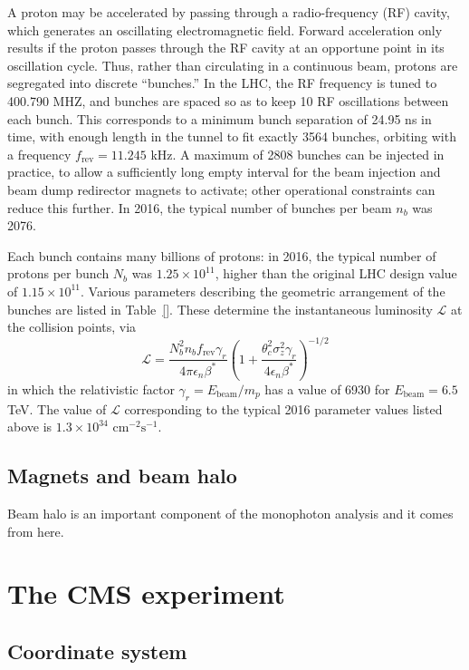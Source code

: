 \documentclass[oneside, letterpaper, 12pt, oldfontcommands]{memoir}
\begin{document}
A proton may be accelerated by passing through a radio-frequency (RF) cavity, which generates an oscillating electromagnetic
field. Forward acceleration only results if the proton passes through the RF cavity at an opportune point in its oscillation cycle.
Thus, rather than circulating in a continuous beam, protons are segregated into discrete ``bunches.'' In the LHC, the RF
frequency is tuned to 400.790 MHZ, and bunches are spaced so as to keep 10 RF oscillations between each bunch. This corresponds
to a minimum bunch separation of 24.95 ns in time, with enough length in the tunnel to fit exactly 3564 bunches, orbiting
with a frequency $f_\mathrm{rev} = 11.245$ kHz. A maximum of
2808 bunches can be injected in practice, to allow a sufficiently long empty interval for the beam injection and beam dump
redirector magnets to activate; other operational constraints can reduce this further.
In 2016, the typical number of bunches per beam $n_b$ was 2076.

Each bunch contains many billions of protons: in 2016, the typical number of protons per bunch $N_b$ was $1.25 \times 10^{11}$, higher than
the original LHC design value of $1.15 \times 10^{11}$. Various parameters describing the geometric arrangement of the bunches
are listed in Table~\ref{}. These determine the instantaneous luminosity $\mathcal{L}$ at the collision points, via
\begin{equation}
\mathcal{L} = \frac{N_{b}^{2}n_{b}f_\mathrm{rev}\gamma_{r}}{4\pi\epsilon_{n}\beta^\mathrm{*}}\left(1 + \frac{\theta_{c}^{2}\sigma_{z}^{2}\gamma_{r}}{4\epsilon_{n}\beta^\mathrm{*}}\right)^{-1/2}
\end{equation}
in which the relativistic factor $\gamma_{r} = E_\mathrm{beam}/m_{p}$ has a value of 6930 for $E_\mathrm{beam} = 6.5$ TeV.
The value of $\mathcal{L}$ corresponding to the typical 2016 parameter values listed above is $1.3 \times 10^{34}$ $\mathrm{cm}^{-2}\mathrm{s}^{-1}$.

\subsection{Magnets and beam halo} \label{sec:LHCCMS_LHC_magnets_beam_halo}
Beam halo is an important component of the monophoton analysis and it comes from here.
\section{The CMS experiment} \label{sec:LHCCMS_CMS}
\subsection{Coordinate system} \label{sec:LHCCMS_CMS_coordinates}
\end{document}
